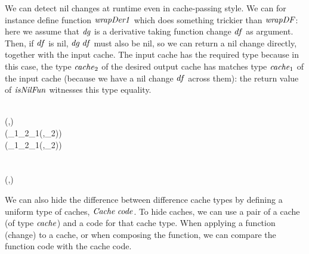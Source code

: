 We can detect nil changes at runtime even in cache-passing style. We can for
instance define function \ensuremath{\Varid{wrapDer1}} which does something trickier than \ensuremath{\Varid{wrapDF}}:
here we assume that \ensuremath{\Varid{dg}} is a derivative taking function change \ensuremath{\Varid{df}} as
argument. Then, if \ensuremath{\Varid{df}} is nil, \ensuremath{\Varid{dg}\;\Varid{df}} must also be nil, so we can return a nil
change directly, together with the input cache.
The input cache has the required type because in this case, the type \ensuremath{\Varid{cache}_{2}} of
the desired output cache has matches type \ensuremath{\Varid{cache}_{1}} of the input cache (because
we have a nil change \ensuremath{\Varid{df}} across them): the return value of \ensuremath{\Varid{isNilFun}} witnesses
this type equality.
\begin{hscode}\SaveRestoreHook
{}%
%
%
%
\>[B]{}\mathrel{:\mkern-1mu:}{}\<[E]%
\\
\>[B]{}\<[3]%
\>[3]{}(\;,\;)\Rightarrow{}\<[E]%
\\
\>[B]{}\<[3]%
\>[3]{}(\;\;\;\;_{1}\;_{2}\to {}\;_{1}\to (\Delta {},\;_{2}))\to {}\<[E]%
\\
\>[B]{}\<[3]%
\>[3]{}(\;\;\;\;_{1}\;_{2}\to {}\;_{1}\to (\Delta {},\;_{2})){}\<[E]%
\\
\>[B]{}\;\;\;\mathrel{=}{}\<[E]%
\\
\>[B]{}\<[3]%
\>[3]{}\;\;\;\<[E]%
\\
\>[3]{}\<[5]%
\>[5]{}\;\to (\;,){}\<[E]%
\\
\>[3]{}\<[5]%
\>[5]{}\to {}\;\;\<[E]%
\ColumnHook
\end{hscode}\resethooks

We can also hide the difference between difference cache types by defining a
uniform type of caches, \ensuremath{\Conid{Cache}\;\Varid{code}}.
To hide caches, we can use a pair of a cache (of type \ensuremath{\Varid{cache}})
and a code for that cache type. When applying a function (change) to a cache, or
when composing the function, we can compare the function code with the cache
code.

